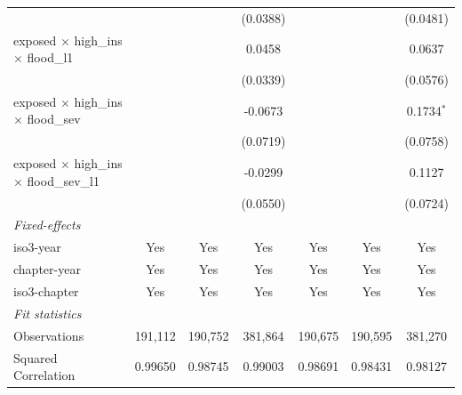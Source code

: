 \begin{tabular}{lcccccc}
                                                           &                 &                 & (0.0388)              &                       &                 & (0.0481)\\   
   exposed $\times$ high\_ins $\times$ flood\_l1           &                 &                 & 0.0458                &                       &                 & 0.0637\\   
                                                           &                 &                 & (0.0339)              &                       &                 & (0.0576)\\   
   exposed $\times$ high\_ins $\times$ flood\_sev          &                 &                 & -0.0673               &                       &                 & 0.1734$^{*}$\\   
                                                           &                 &                 & (0.0719)              &                       &                 & (0.0758)\\   
   exposed $\times$ high\_ins $\times$ flood\_sev\_l1      &                 &                 & -0.0299               &                       &                 & 0.1127\\   
                                                           &                 &                 & (0.0550)              &                       &                 & (0.0724)\\   
   \midrule
   \emph{Fixed-effects}\\
   iso3-year                                               & Yes             & Yes             & Yes                   & Yes                   & Yes             & Yes\\  
   chapter-year                                            & Yes             & Yes             & Yes                   & Yes                   & Yes             & Yes\\  
   iso3-chapter                                            & Yes             & Yes             & Yes                   & Yes                   & Yes             & Yes\\  
   \midrule
   \emph{Fit statistics}\\
   Observations                                            & 191,112         & 190,752         & 381,864               & 190,675               & 190,595         & 381,270\\  
   Squared Correlation                                     & 0.99650         & 0.98745         & 0.99003               & 0.98691               & 0.98431         & 0.98127\\  

\end{tabular}
